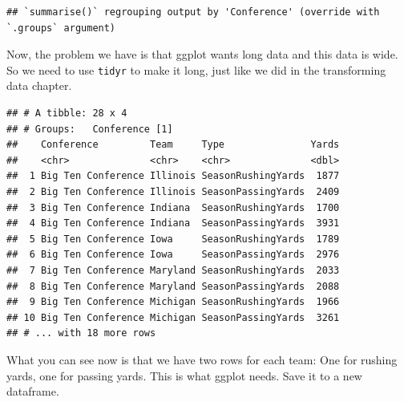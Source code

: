 \documentclass[
]{book}
\newenvironment{Shaded}{\begin{snugshade}}{\end{snugshade}}
\newcommand{\DataTypeTok}[1]{\textcolor[rgb]{0.13,0.29,0.53}{#1}}
\newcommand{\KeywordTok}[1]{\textcolor[rgb]{0.13,0.29,0.53}{\textbf{#1}}}
\newcommand{\NormalTok}[1]{#1}
\newcommand{\OperatorTok}[1]{\textcolor[rgb]{0.81,0.36,0.00}{\textbf{#1}}}
\newcommand{\StringTok}[1]{\textcolor[rgb]{0.31,0.60,0.02}{#1}}
\begin{document}
\begin{verbatim}
## `summarise()` regrouping output by 'Conference' (override with `.groups` argument)
\end{verbatim}

Now, the problem we have is that ggplot wants long data and this data is wide. So we need to use \texttt{tidyr} to make it long, just like we did in the transforming data chapter.

\begin{Shaded}
\end{Shaded}

\begin{verbatim}
## # A tibble: 28 x 4
## # Groups:   Conference [1]
##    Conference         Team     Type               Yards
##    <chr>              <chr>    <chr>              <dbl>
##  1 Big Ten Conference Illinois SeasonRushingYards  1877
##  2 Big Ten Conference Illinois SeasonPassingYards  2409
##  3 Big Ten Conference Indiana  SeasonRushingYards  1700
##  4 Big Ten Conference Indiana  SeasonPassingYards  3931
##  5 Big Ten Conference Iowa     SeasonRushingYards  1789
##  6 Big Ten Conference Iowa     SeasonPassingYards  2976
##  7 Big Ten Conference Maryland SeasonRushingYards  2033
##  8 Big Ten Conference Maryland SeasonPassingYards  2088
##  9 Big Ten Conference Michigan SeasonRushingYards  1966
## 10 Big Ten Conference Michigan SeasonPassingYards  3261
## # ... with 18 more rows
\end{verbatim}

What you can see now is that we have two rows for each team: One for rushing yards, one for passing yards. This is what ggplot needs. Save it to a new dataframe.

\begin{Shaded}
\end{Shaded}
\end{document}
